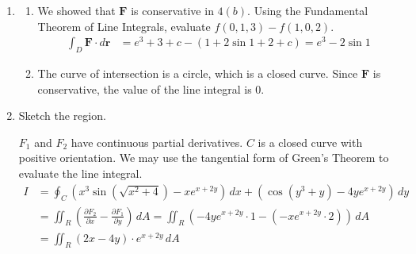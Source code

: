 \documentclass[a4paper, 12pt]{article}
\begin{document}
\begin{enumerate}[leftmargin=*,label=\textbf{\arabic*.}]
\begin{enumerate}[leftmargin=*,label=\textbf{\alph*.}]
The potential function for $\mathbf{F}$ is
\[\boxed{f(x,y,z)=x^2+z\sin x+xy^2+y{e}^z+z+c,\quad c\in\mathbb{R}}\]

\end{enumerate}
\item \begin{enumerate}[leftmargin=*,label=\textbf{\alph*.}]
\item We showed that $\mathbf{F}$ is conservative in $4(b)$. Using the Fundamental Theorem of Line Integrals, evaluate $f(0,1,3)-f(1,0,2)$.
\begin{align*}\int_D\mathbf{F}\cdot d\mathbf{r}&={e}^3+3+c-(1+2\sin1+2+c)=\boxed{{e}^3-2\sin1}\end{align*}

\item The curve of intersection is a circle, which is a closed curve. Since $\mathbf{F}$ is conservative, the value of the line integral is $\boxed0$.

\end{enumerate}

\item Sketch the region.
\begin{center}
\end{center}

${F}_1$ and ${F}_2$ have continuous partial derivatives. $C$ is a closed curve with positive orientation. We may use the tangential form of Green's Theorem to evaluate the line integral.
\begin{align}{I}&=\oint_C\left(x^3\sin\left(\sqrt{x^2+4}\right)-x{e}^{x+2y}\right)\,dx + \left(\cos\left(y^3+y\right)-4y{e}^{x+2y}\right)\,dy\nonumber\\[1em]&=\iint_R\left(\frac{\partial{F}_2}{\partial x}-\frac{\partial{F}_1}{\partial y}\right)\,dA=\iint_R\left(-4y{e}^{x+2y}\cdot1-\left(-x{e}^{x+2y}\cdot2\right)\right)\,dA\nonumber\\[1em]&=\iint_R(2x-4y)\cdot{e}^{x+2y}\,dA\label{eq:23_24_fall_resit_1}
\end{align}


\end{enumerate}
\end{document}

